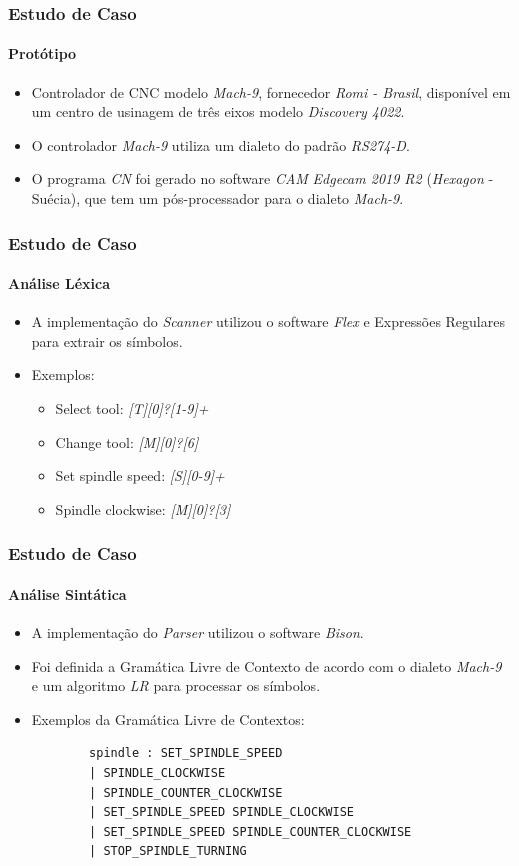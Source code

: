 \documentclass[aspectratio=169]{beamer}
\begin{document}
{\begin{frame}
  \end{frame}


\begin{frame}
  \frametitle{Estudo de Caso}
  \framesubtitle{Protótipo}

  \begin{itemize}
    \item Controlador de CNC modelo \emph{Mach-9}, fornecedor 
          \emph{Romi - Brasil}, disponível em um centro de usinagem de
           três eixos modelo \emph{Discovery 4022}.
    \item O controlador \emph{Mach-9} utiliza um dialeto do padrão 
          \emph{RS274-D}.
    \item O programa \emph{CN} foi gerado no software \emph{CAM} 
          \emph{Edgecam 2019 R2} (\emph{Hexagon} - Suécia), que tem um 
          pós-processador para o dialeto \emph{Mach-9}.
  \end{itemize}

\end{frame}


\begin{frame}
  \frametitle{Estudo de Caso}
  \framesubtitle{Análise Léxica}
  \begin{itemize}
    \item A implementação do \emph{Scanner} utilizou o software 
          \emph{Flex} e Expressões Regulares para extrair os símbolos.
    \item Exemplos:
      \begin{itemize}
        \item Select tool: \emph{[T][0]?[1-9]+}
        \item Change tool: \emph{[M][0]?[6]}
        \item Set spindle speed: \emph{[S][0-9]+}
        \item Spindle clockwise: \emph{[M][0]?[3]}
      \end{itemize}  
  \end{itemize}

\end{frame}


\begin{frame}[fragile]
  \frametitle{Estudo de Caso}
  \framesubtitle{Análise Sintática}
  \begin{itemize}
    \item A implementação do \emph{Parser} utilizou o software 
          \emph{Bison}.
    \item Foi definida a Gramática Livre de Contexto de acordo com o 
          dialeto \emph{Mach-9} e um algoritmo \emph{LR}
          para processar os símbolos.
    \item Exemplos da Gramática Livre de Contextos:
      \begin{lstlisting}
        spindle : SET_SPINDLE_SPEED
        | SPINDLE_CLOCKWISE
        | SPINDLE_COUNTER_CLOCKWISE
        | SET_SPINDLE_SPEED SPINDLE_CLOCKWISE
        | SET_SPINDLE_SPEED SPINDLE_COUNTER_CLOCKWISE
        | STOP_SPINDLE_TURNING
      

\end{lstlisting}
\end{itemize}
\end{frame}}
\end{document}
